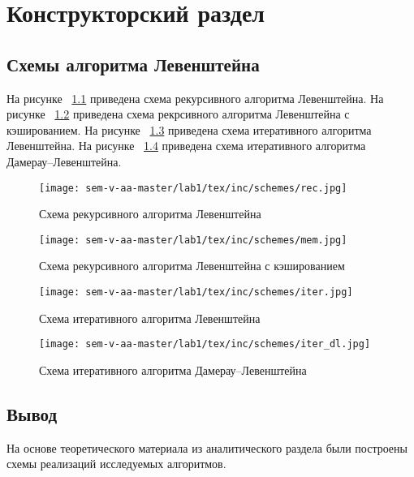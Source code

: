 \chapter{Конструкторский раздел}
\label{cha:design}

\section{Схемы алгоритма Левенштейна}
На рисунке ~\ref{fig:rec_lev} приведена схема рекурсивного алгоритма Левенштейна.
На рисунке ~\ref{fig:rec_lev_memo} приведена схема рекрсивного алгоритма Левенштейна с кэшированием.
На рисунке ~\ref{fig:iter_lev} приведена схема итеративного алгоритма Левенштейна.
На рисунке ~\ref{fig:dam_lev} приведена схема итеративного алгоритма Дамерау--Левенштейна.
\begin{figure}
    \centering
    \texttt{[image: sem-v-aa-master/lab1/tex/inc/schemes/rec.jpg]}
    \caption{Схема рекурсивного алгоритма Левенштейна}
    \label{fig:rec_lev}
\end{figure}
\begin{figure}
    \centering
    \texttt{[image: sem-v-aa-master/lab1/tex/inc/schemes/mem.jpg]}
    \caption{Схема рекурсивного алгоритма Левенштейна с кэшированием}
    \label{fig:rec_lev_memo}
\end{figure}
\begin{figure}
    \centering
    \texttt{[image: sem-v-aa-master/lab1/tex/inc/schemes/iter.jpg]}
    \caption{Схема итеративного алгоритма Левенштейна}
    \label{fig:iter_lev}
\end{figure}
\begin{figure}
    \centering
    \texttt{[image: sem-v-aa-master/lab1/tex/inc/schemes/iter\_dl.jpg]}
    \caption{Схема итеративного алгоритма Дамерау--Левенштейна}
    \label{fig:dam_lev}
\end{figure}

\section{Вывод}

На основе теоретического материала из аналитического раздела были построены схемы реализаций исследуемых алгоритмов.

